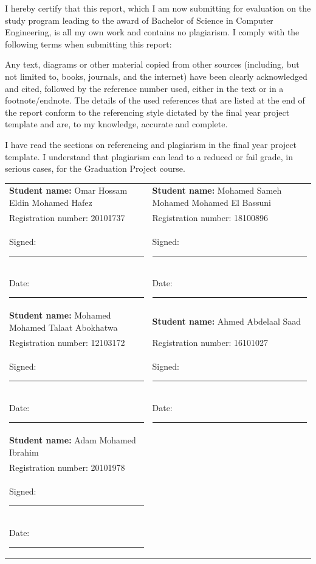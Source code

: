 I hereby certify that this report, which I am now submitting for evaluation on
the study program leading to the award of Bachelor of Science in Computer
Engineering, is all my own work and contains no plagiarism. I comply with the
following terms when submitting this report:

Any text, diagrams or other material copied from other sources (including, but
not limited to, books, journals, and the internet) have been clearly
acknowledged and cited, followed by the reference number used, either in the
text or in a footnote/endnote. The details of the used references that are
listed at the end of the report conform to the referencing style dictated by
the final year project template and are, to my knowledge, accurate and
complete.

I have read the sections on referencing and plagiarism in the final year
project template. I understand that plagiarism can lead to a reduced or fail
grade, in serious cases, for the Graduation Project course.

\vspace{0.8cm}
\noindent
\begin{tabular}{@{}p{}p{}@{}}
\textbf{Student name:} Omar Hossam Eldin Mohamed Hafez & \textbf{Student name:} Mohamed Sameh Mohamed Mohamed El Bassuni\\
Registration number: 20101737 & Registration number: 18100896\\
Signed: \rule{3cm}{0.3pt} & Signed: \rule{3cm}{0.3pt}\\
Date: \rule{3cm}{0.3pt} & Date: \rule{3cm}{0.3pt}\\[0.6cm]
\textbf{Student name:} Mohamed Mohamed Talaat Abokhatwa & \textbf{Student name:} Ahmed Abdelaal Saad\\
Registration number: 12103172 & Registration number: 16101027\\
Signed: \rule{3cm}{0.3pt} & Signed: \rule{3cm}{0.3pt}\\
Date: \rule{3cm}{0.3pt} & Date: \rule{3cm}{0.3pt}\\[0.6cm]
\textbf{Student name:} Adam Mohamed Ibrahim & \\
Registration number: 20101978 & \\
Signed: \rule{3cm}{0.3pt} & \\
Date: \rule{3cm}{0.3pt} & \\
\end{tabular}

\clearpage
